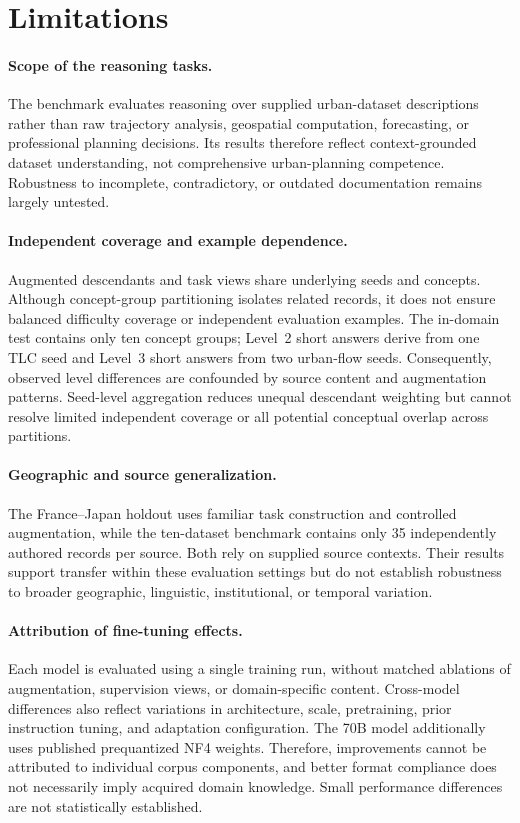 \documentclass[a4paper,fleqn]{cas-sc}
\begin{document}
\section{Limitations}
\label{sec:limitations}

\paragraph{Scope of the reasoning tasks.}
The benchmark evaluates reasoning over supplied urban-dataset descriptions rather than raw trajectory analysis, geospatial computation, forecasting, or professional planning decisions. Its results therefore reflect context-grounded dataset understanding, not comprehensive urban-planning competence. Robustness to incomplete, contradictory, or outdated documentation remains largely untested.

\paragraph{Independent coverage and example dependence.}
Augmented descendants and task views share underlying seeds and concepts. Although concept-group partitioning isolates related records, it does not ensure balanced difficulty coverage or independent evaluation examples. The in-domain test contains only ten concept groups; Level~2 short answers derive from one TLC seed and Level~3 short answers from two urban-flow seeds. Consequently, observed level differences are confounded by source content and augmentation patterns. Seed-level aggregation reduces unequal descendant weighting but cannot resolve limited independent coverage or all potential conceptual overlap across partitions.

\paragraph{Geographic and source generalization.}
The France--Japan holdout uses familiar task construction and controlled augmentation, while the ten-dataset benchmark contains only 35 independently authored records per source. Both rely on supplied source contexts. Their results support transfer within these evaluation settings but do not establish robustness to broader geographic, linguistic, institutional, or temporal variation.

\paragraph{Attribution of fine-tuning effects.}
Each model is evaluated using a single training run, without matched ablations of augmentation, supervision views, or domain-specific content. Cross-model differences also reflect variations in architecture, scale, pretraining, prior instruction tuning, and adaptation configuration. The 70B model additionally uses published prequantized NF4 weights. Therefore, improvements cannot be attributed to individual corpus components, and better format compliance does not necessarily imply acquired domain knowledge. Small performance differences are not statistically established.
\end{document}
